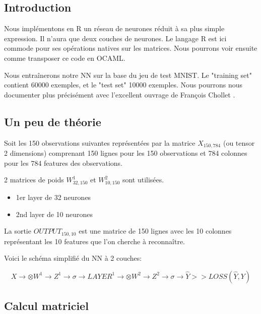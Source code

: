\documentclass[11pt]{book}
\begin{document}
\subsection{Introduction}

Nous implémentons en R un réseau de neurones réduit à sa plus simple expression.
Il n'aura que deux couches de neurones.
Le langage R est ici commode pour ses opérations natives sur les matrices.
Nous pourrons voir ensuite comme transposer ce code en OCAML.

Nous entraînerons notre NN sur la base du jeu de test MNIST.
Le  "training set" contient 60000 exemples, et le "test set" 10000 exemples.
Nous pourrons nous documenter plus précisément avec l'excellent ouvrage de François Chollet \cite{deepR}.

\subsection{Un peu de théorie}

Soit les 150 observations suivantes représentées par la matrice $X_{150,784}$ (ou tensor 2 dimensions) comprenant 150 lignes pour les 150 observations et 784 colonnes pour les 784 features des observations.

2 matrices de poids $W^1_{32,150}$ et $W^2_{10,150}$ sont utilisées.

\begin{itemize}
	\item 1er layer de 32 neurones
	\item 2nd layer de 10 neurones
\end{itemize}

La sortie $OUTPUT_{150,10}$ est une matrice de 150 lignes avec les 10 colonnes représentant 
les 10 features que l'on cherche à reconnaître.

Voici le schéma simplifié du NN à 2 couches:

$$
X \longrightarrow \otimes W^1 \rightarrow  Z^1 \rightarrow \sigma \rightarrow LAYER^1 \longrightarrow
\otimes W^2 
\rightarrow Z^2 
\rightarrow 
\sigma 
\rightarrow \hat{Y} 
>> LOSS(\hat{Y}, Y)
$$

\subsection{Calcul matriciel}
\end{document}
